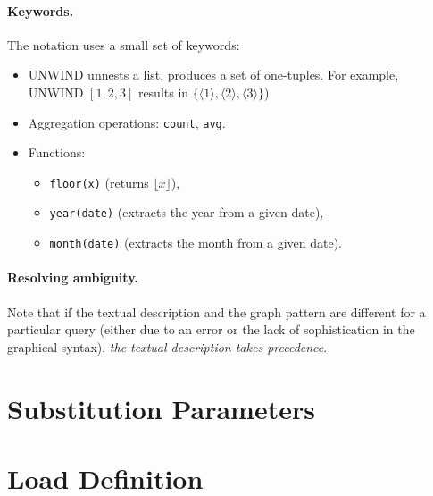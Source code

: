 \newcommand{\tuple}[1]{\langle #1 \rangle}

\paragraph{Keywords.} The notation uses a small set of keywords:

\begin{itemize}
	\item \textsf{UNWIND} unnests a list, \ie produces a set of one-tuples. For example, UNWIND $ [1, 2, 3] $ results in $ \{ \tuple{1}, \tuple{2}, \tuple{3} \} $)
	\item Aggregation operations: \lstinline{count}, \lstinline{avg}. %
	\item Functions:
	\begin{itemize}
		\item \lstinline{floor(x)} (returns $\lfloor x \rfloor$),
		\item \lstinline{year(date)} (extracts the year from a given date),
		\item \lstinline{month(date)} (extracts the month from a given date).
	\end{itemize}
\end{itemize}

\paragraph{Resolving ambiguity.} Note that if the textual description and the graph pattern are different for a particular query (either due to an error or the lack of sophistication in the graphical syntax), \emph{the textual description takes precedence}.


\section{Substitution Parameters}




\section{Load Definition}


